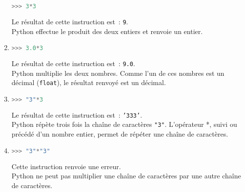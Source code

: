 \begin{corrige}
\begin{enumerate}
\begin{lstlisting}[language=Python]
>>> 3*3
\end{lstlisting}
Le résultat de cette instruction est~: \texttt{9}.\\
Python effectue le produit des deux entiers et renvoie un entier.
\item %
\begin{lstlisting}[language=Python]
>>> 3.0*3
\end{lstlisting}
Le résultat de cette instruction est~: \texttt{9.0}.\\
Python multiplie les deux nombres. Comme l'un de ces nombres est un décimal (\texttt{float}), le résultat renvoyé est un décimal.
\item %
\begin{lstlisting}[language=Python]
>>> "3"*3
\end{lstlisting}
Le résultat de cette instruction est~: \texttt{'333'}.\\
Python répète trois fois la chaîne de caractères \texttt{"3"}. L'opérateur *,  suivi ou précédé d'un nombre entier, permet de répéter une chaîne de caractères.
\item %
\begin{lstlisting}[language=Python]
>>> "3"*"3"
\end{lstlisting}
Cette instruction renvoie une erreur.\\
Python ne peut pas multiplier une chaîne de caractères par une autre chaîne de caractères.
\end{enumerate}
\end{corrige}

